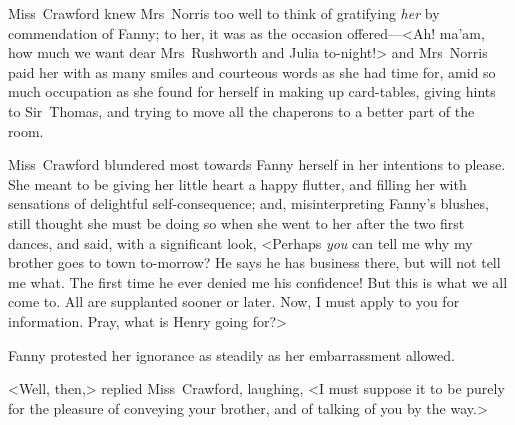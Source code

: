 Miss~Crawford knew Mrs~Norris too well to think of gratifying \textit{her}  by commendation of Fanny; to her, it was as the occasion offered—<Ah! ma'am, how much we want dear Mrs~Rushworth and Julia to-night!> and Mrs~Norris paid her with as many smiles and courteous words as she had time for, amid so much occupation as she found for herself in making up card-tables, giving hints to Sir~Thomas, and trying to move all the chaperons to a better part of the room.

Miss~Crawford blundered most towards Fanny herself in her intentions to please. She meant to be giving her little heart a happy flutter, and filling her with sensations of delightful self-consequence; and, misinterpreting Fanny's blushes, still thought she must be doing so when she went to her after the two first dances, and said, with a significant look, <Perhaps \textit{you}  can tell me why my brother goes to town to-morrow? He says he has business there, but will not tell me what. The first time he ever denied me his confidence! But this is what we all come to. All are supplanted sooner or later. Now, I must apply to you for information. Pray, what is Henry going for?>

Fanny protested her ignorance as steadily as her embarrassment allowed.

<Well, then,> replied Miss~Crawford, laughing, <I must suppose it to be purely for the pleasure of conveying your brother, and of talking of you by the way.>


